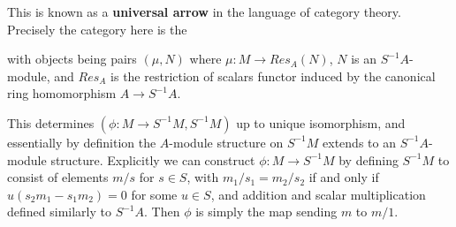 \begin{center}
\end{center}
This is known as a \textbf{universal arrow} in the language of category theory. Precisely the category here is the 
\begin{center}
\end{center}
with objects being pairs $(\mu,N)$ where $\mu:M\rightarrow Res_{A}(N)$, $N$ is an $S^{-1}A$-module, and $Res_A$ is the restriction of scalars functor induced by the canonical ring homomorphism $A\rightarrow S^{-1}A$.

This determines $(\phi:M\rightarrow S^{-1}M,S^{-1}M)$ up to unique isomorphism, and essentially by definition the $A$-module structure on $S^{-1}M$ extends to an $S^{-1}A$-module structure. Explicitly we can construct $\phi:M\rightarrow S^{-1}M$ by defining $S^{-1}M$ to consist of elements $m/s$ for $s \in S$, with $m_1/s_1 = m_2/s_2$ if and only if $u(s_2m_1-s_1m_2) = 0$ for some $u \in S$, and addition and scalar multiplication defined similarly to $S^{-1}A$. Then $\phi$ is simply the map sending $m$ to $m/1$.

